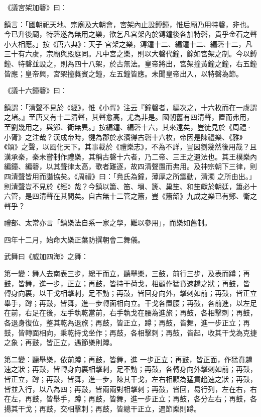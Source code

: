 \begin{pinyinscope}
 《議宮架加磬》曰：



 鎮言：「國朝祀天地、宗廟及大朝會，宮架內止設鎛鐘，惟后廟乃用特磬，非也。今已升後廟，特磬遂為無用之樂，欲乞凡宮架內於鎛鐘後各加特磬，貴乎金石之聲小大相應。」按《唐六典》：天子
 宮架之樂，鎛鐘十二、編鐘十二、編磬十二，凡三十有六虡，宗廟與殿庭同。凡中宮之樂，則以大磬代鐘，餘如宮架之制。今以鎛鐘、特磬並設之，則為四十八架，於古無法。皇帝將出，宮架撞黃鐘之鐘，右五鐘皆應；皇帝興，宮架撞蕤賓之鐘，左五鐘皆應。未聞皇帝出入，以特磬為節。



 《議十六鐘磬》曰：



 鎮謂：「清聲不見於《經》，惟《小胥》注云『鐘磬者，編次之，十六枚而在一虡謂之堵。』至唐又有十二清聲，其聲愈高，尤為非是。國朝舊有四清聲，置而弗用，
 至劉幾用之，與鄭、衛無異。」按編鐘、編磬十六，其來遠矣，豈徒見於《周禮·小胥》之注哉？漢成帝時，犍為郡於水濱得古磬十六枚，帝因是陳禮樂、《雅》《頌》之聲，以風化天下。其事載於《禮樂志》，不為不詳，豈因劉幾然後用哉？且漢承秦，秦未嘗制作禮樂，其稱古磬十六者，乃二帝、三王之遺法也。其王樸樂內編鐘、編磬，以其聲律太高，歌者難逐，故四清聲置而弗用。及神宗朝下三律，則四清聲皆用而諧協矣。《周禮》曰：「鳧氏為鐘，薄厚之所震動，清濁
 之所由出。」則清聲豈不見於《經》哉？今鎮以簫、笛、塤、篪、巢笙、和笙獻於朝廷，簫必十六管，是四清聲在其間矣。自古無十二管之簫，豈《簫韶》九成之樂已有鄭、衛之聲乎？



 禮部、太常亦言「鎮樂法自系一家之學，難以參用」，而樂如舊制。



 四年十二月，始命大樂正葉防撰朝會二舞儀。



 武舞曰《威加四海》之舞：



 第一變：舞人去南表三步，總干而立，聽舉樂，三鼓，前行三步，及表而蹲；再鼓，皆舞，進一步，正立；再鼓，皆持干荷戈，相顧作猛賁速趫之狀；再鼓，皆
 轉身向裏，以干戈相擊刺，足不動；再鼓，皆回身向外，擊刺如前；再鼓，皆正立舉手，蹲；再鼓，皆舞，進一步轉面相向立。干戈各置腰；再鼓，各前進，以左足在前，右足在後，左手執乾當前，右手執戈在腰為進旅；再鼓，各相擊刺；再鼓，各退身復位，整其乾為退旅；再鼓，皆正立，蹲；再鼓，皆舞，進一步正立；再鼓，皆轉面相向，秉乾持戈坐作；再鼓，各相擊刺；再鼓，皆起，收其干戈為克捷之象；再鼓，皆正立，遇節樂則蹲。



 第二變：聽舉樂，依前蹲；再鼓，皆舞，進
 一步正立；再鼓，皆正面，作猛賁趫速之狀；再鼓，皆轉身向裏相擊刺，足不動；再鼓，各轉身向外擊刺如前；再鼓，皆正立，蹲；再鼓，皆舞，進一步，陳其干戈，左右相顧為猛賁趫速之狀；再鼓，皆並入行，以八為四；再鼓，皆兩兩對相擊刺；再鼓，皆回，易行列，左在右，右在左，再鼓，皆舉手，蹲；再鼓，皆舞，進一步正立；再鼓，各分左右；再鼓，各揚其干戈；再鼓，交相擊刺；再鼓，皆總干正立，遇節樂則蹲。




\end{pinyinscope}
